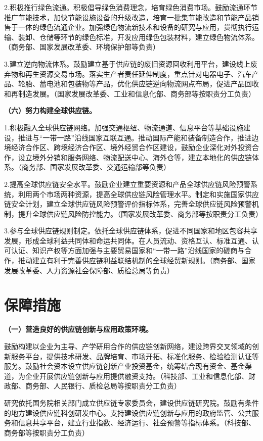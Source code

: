2.积极推行绿色流通。积极倡导绿色消费理念，培育绿色消费市场。鼓励流通环节推广节能技术，加快节能设施设备的升级改造，培育一批集节能改造和节能产品销售于一体的绿色流通企业。加强绿色物流新技术和设备的研究与应用，贯彻执行运输、装卸、仓储等环节的绿色标准，开发应用绿色包装材料，建立绿色物流体系。（商务部、国家发展改革委、环境保护部等负责）

3.建立逆向物流体系。鼓励建立基于供应链的废旧资源回收利用平台，建设线上废弃物和再生资源交易市场。落实生产者责任延伸制度，重点针对电器电子、汽车产品、轮胎、蓄电池和包装物等产品，优化供应链逆向物流网点布局，促进产品回收和再制造发展。（国家发展改革委、工业和信息化部、商务部等按职责分工负责）

{ \bf （六）努力构建全球供应链。 }

1.积极融入全球供应链网络。加强交通枢纽、物流通道、信息平台等基础设施建设，推进与“一带一路”沿线国家互联互通。推动国际产能和装备制造合作，推进边境经济合作区、跨境经济合作区、境外经贸合作区建设，鼓励企业深化对外投资合作，设立境外分销和服务网络、物流配送中心、海外仓等，建立本地化的供应链体系。（商务部、国家发展改革委、交通运输部等负责）

2.提高全球供应链安全水平。鼓励企业建立重要资源和产品全球供应链风险预警系统，利用两个市场两种资源，提高全球供应链风险管理水平。制定和实施国家供应链安全计划，建立全球供应链风险预警评价指标体系，完善全球供应链风险预警机制，提升全球供应链风险防控能力。（国家发展改革委、商务部等按职责分工负责）

3.参与全球供应链规则制定。依托全球供应链体系，促进不同国家和地区包容共享发展，形成全球利益共同体和命运共同体。在人员流动、资格互认、标准互通、认可认证、知识产权等方面加强与主要贸易国家和“一带一路”沿线国家的磋商与合作，推动建立有利于完善供应链利益联结机制的全球经贸新规则。（商务部、国家发展改革委、人力资源社会保障部、质检总局等负责）

\section{保障措施}

{ \bf （一）营造良好的供应链创新与应用政策环境。 }

鼓励构建以企业为主导、产学研用合作的供应链创新网络，建设跨界交叉领域的创新服务平台，提供技术研发、品牌培育、市场开拓、标准化服务、检验检测认证等服务。鼓励社会资本设立供应链创新产业投资基金，统筹结合现有资金、基金渠道，为企业开展供应链创新与应用提供融资支持。（科技部、工业和信息化部、财政部、商务部、人民银行、质检总局等按职责分工负责）

研究依托国务院相关部门成立供应链专家委员会，建设供应链研究院。鼓励有条件的地方建设供应链科创研发中心。支持建设供应链创新与应用的政府监管、公共服务和信息共享平台，建立行业指数、经济运行、社会预警等指标体系。（科技部、商务部等按职责分工负责）

